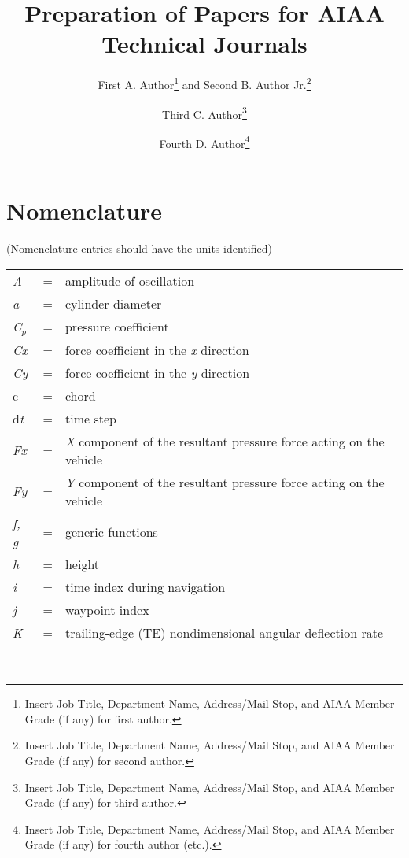 \documentclass{AIAA}
\begin{document}
\title{Preparation of Papers for AIAA Technical Journals}

\author{First A. Author\footnote{Insert Job Title, Department Name, Address/Mail Stop, and AIAA Member Grade (if any) for first author.} and Second B. Author Jr.\footnote{Insert Job Title, Department Name, Address/Mail Stop, and AIAA Member Grade (if any) for second author.}}
\author{Third C. Author\footnote{Insert Job Title, Department Name, Address/Mail Stop, and AIAA Member Grade (if any) for third author.}}
\author{Fourth D. Author\footnote{Insert Job Title, Department Name, Address/Mail Stop, and AIAA Member Grade (if any) for fourth author (etc.).}}

\begin{abstract}

\end{abstract}

\maketitle

\section*{Nomenclature}
(Nomenclature entries should have the units identified)\\
\noindent\begin{tabular}{@{}lcl@{}}
\textit{A}  &=& amplitude of oscillation \\
\textit{a   }&=&    cylinder diameter \\
\textit{C}$_{p}$&=& pressure coefficient \\
\textit{Cx} &=& force coefficient in the \textit{x} direction \\
\textit{Cy} &=& force coefficient in the \textit{y} direction \\
c   &=& chord \\
d\textit{t} &=& time step \\
\textit{Fx} &=& \textit{X} component of the resultant pressure force acting on the vehicle \\
\textit{Fy} &=& \textit{Y} component of the resultant pressure force acting on the vehicle \\
\textit{f, g}   &=& generic functions \\
\textit{h}  &=& height \\
\textit{i}  &=& time index during navigation \\
\textit{j}  &=& waypoint index \\
\textit{K}  &=& trailing-edge (TE) nondimensional angular deflection rate
\end{tabular} \\
\end{document}
